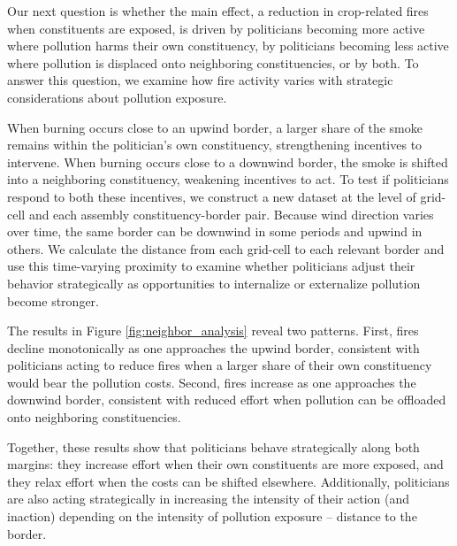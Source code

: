 \documentclass[12pt]{article}
\begin{document}
 
Our next question is whether the main effect, a reduction in crop-related fires when constituents are exposed, is driven by politicians becoming more active where pollution harms their own constituency, by politicians becoming less active where pollution is displaced onto neighboring constituencies, or by both. To answer this question, we examine how fire activity varies with strategic considerations about pollution exposure.


When burning occurs close to an upwind border, a larger share of the smoke remains within the politician’s own constituency, strengthening incentives to intervene. When burning occurs close to a downwind border, the smoke is shifted into a neighboring constituency, weakening incentives to act.
To test if politicians respond to both these incentives, we construct a new dataset at the level of grid-cell and each assembly constituency-border pair. Because wind direction varies over time, the same border can be downwind in some periods and upwind in others. We calculate the distance from each grid-cell to each relevant border and use this time-varying proximity to examine whether politicians adjust their behavior strategically as opportunities to internalize or externalize pollution become stronger.


The results in Figure \ref{fig:neighbor_analysis} reveal two patterns. First, fires decline monotonically as one approaches the upwind border, consistent with politicians acting to reduce fires when a larger share of their own constituency would bear the pollution costs. Second, fires increase as one approaches the downwind border, consistent with reduced effort when pollution can be offloaded onto neighboring constituencies. 

Together, these results show that politicians behave strategically along both margins: they increase effort when their own constituents are more exposed, and they relax effort when the costs can be shifted elsewhere. Additionally, politicians are also acting strategically in increasing the intensity of their action (and inaction) depending on the intensity of pollution exposure -- distance to the border.
\end{document}

